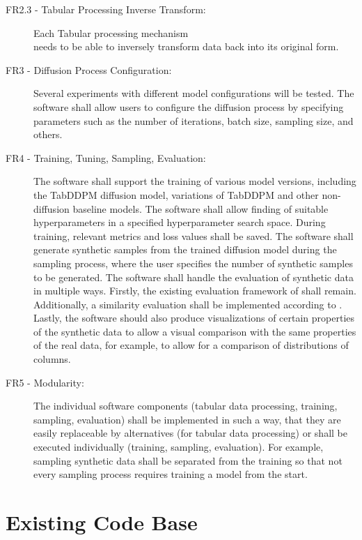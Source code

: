 \begin{description}
		\item[FR2.3 - Tabular Processing Inverse Transform:]
		Each Tabular processing mechanism \\needs to be able to inversely transform data back into its original form.

		\item[FR3 - Diffusion Process Configuration:]
		Several experiments with different model configurations will be tested.
		The software shall allow users to configure the diffusion process by specifying parameters such as the number of iterations, batch size, sampling size, and others.

		\item[FR4 - Training, Tuning, Sampling, Evaluation:]
		The software shall support the training of various model versions, including the TabDDPM diffusion model, variations of TabDDPM and other non-diffusion baseline models.
		The software shall allow finding of suitable hyperparameters in a specified hyperparameter search space.
		During training, relevant metrics and loss values shall be saved.
		The software shall generate synthetic samples from the trained diffusion model during the sampling process, where the user specifies the number of synthetic samples to be generated.
		The software shall handle the evaluation of synthetic data in multiple ways.
		Firstly, the existing evaluation framework of \cite{kotelnikov2022TabDDPMModellingTabular} shall remain.
		Additionally, a similarity evaluation shall be implemented according to \cite{chundawat2022UniversalMetricRobust}.
		Lastly, the software should also produce visualizations of certain properties of the synthetic data to allow a visual comparison with the same properties of the real data, for example, to allow for a comparison of distributions of columns.

	\item[FR5 - Modularity:]
		The individual software components (tabular data processing, training, sampling, evaluation) shall be implemented in such a way,
		that they are easily replaceable by alternatives (for tabular data processing) or shall be executed individually (training, sampling, evaluation).
		For example, sampling synthetic data shall be separated from the training so that not every sampling process requires training a model from the start.
\end{description}


\section{Existing Code Base}
\label{ch:conceptualDesign-existingCodeBase}


